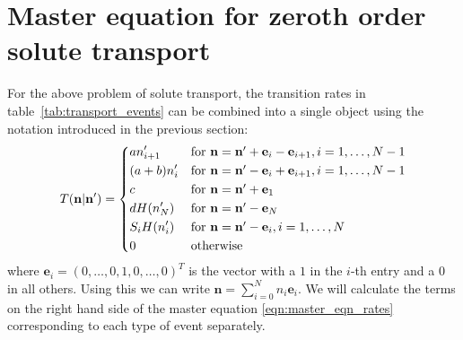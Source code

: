 \documentclass[a4paper,11pt]{report}
\numberwithin{equation}{section}
\newcommand{\V}[1]{\mathbf{#1}}
\begin{document}
\section{Master equation for zeroth order solute transport}
For the above problem of solute transport, the transition rates in
table~\ref{tab:transport_events} can be combined into a single object using the
notation introduced in the previous section:
\begin{equation}
    \label{eqn:transition_rates_zeroth_order}
    T(\V{n}|\V{n}') =%
        \begin{dcases*}
            a n'_{i+1} & for \(\V{n} = \V{n}' + \V{e}_i - \V{e}_{i+1},
            i=1,\dotsc,N-1\)\\
            (a+b) n'_i & for \(\V{n} = \V{n}' - \V{e}_i + \V{e}_{i+1},
            i=1,\dotsc,N-1\)\\
            c & for \(\V{n} = \V{n}' + \V{e}_1\)\\
            d H(n'_N) & for \(\V{n} = \V{n}' - \V{e}_N\)\\
            S_i H(n'_i) & for \(\V{n} = \V{n}' - \V{e}_i, i=1,\dotsc,N\)\\
            0 & otherwise
        \end{dcases*}
\end{equation}
where \(\V{e}_i = (0,\dotsc,0,1,0,\dotsc,0)^T\) is the vector with a \(1\) in
the \(i\)-th entry and a \(0\) in all others. Using this we can write \(\V{n} =
\sum_{i=0}^{N} n_i \V{e}_i\). We will calculate the terms on the right hand side
of the master equation \eqref{eqn:master_eqn_rates} corresponding to each type
of event separately.
\end{document}
